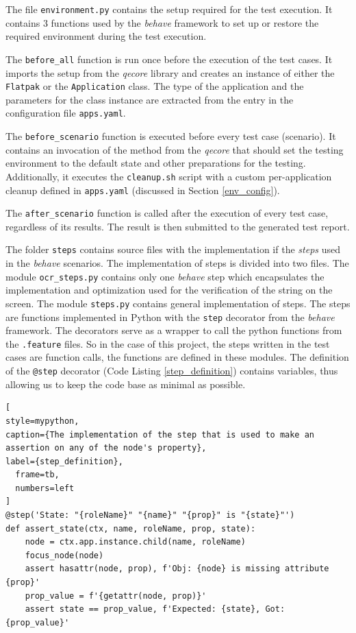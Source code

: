 The file \texttt{environment.py} contains the setup required for the test execution. It contains 3 functions used by the \textit{behave} framework to set up or restore the required environment during the test execution. 

The \texttt{before\_all} function is run once before the execution of the test cases. It imports the setup from the \textit{qecore} library and creates an instance of either the \texttt{Flatpak} or the \texttt{Application} class. The type of the application and the parameters for the class instance are extracted from the entry in the configuration file \texttt{apps.yaml}. 

The \texttt{before\_scenario} function is executed before every test case (scenario). It contains an invocation of the method from the \textit{qecore} that should set the testing environment to the default state and other preparations for the testing. Additionally, it executes the \texttt{cleanup.sh} script with a custom per-application cleanup defined in \texttt{apps.yaml} (discussed in Section \ref{env_config}). 

The \texttt{after\_scenario} function is called after the execution of every test case, regardless of its results. The result is then submitted to the generated test report.

The folder \texttt{steps} contains source files with the implementation if the \textit{steps} used in the \textit{behave} scenarios. The implementation of steps is divided into two files. The module \texttt{ocr\_steps.py} contains only one \textit{behave} step which encapsulates the implementation and optimization used for the verification of the string on the screen. The module \texttt{steps.py} contains general implementation of steps. The steps are functions implemented in Python with the \texttt{step} decorator from the \textit{behave} framework. The decorators serve as a wrapper to call the python functions from the \texttt{.feature} files. So in the case of this project, the steps written in the test cases are function calls, the functions are defined in these modules. The definition of the \texttt{@step} decorator (Code Listing \ref{step_definition}) contains variables, thus allowing us to keep the code base as minimal as possible.

\begin{lstlisting}[
style=mypython,
caption={The implementation of the step that is used to make an assertion on any of the node's property},
label={step_definition},
  frame=tb,
  numbers=left
]
@step('State: "{roleName}" "{name}" "{prop}" is "{state}"')
def assert_state(ctx, name, roleName, prop, state):
    node = ctx.app.instance.child(name, roleName)
    focus_node(node)
    assert hasattr(node, prop), f'Obj: {node} is missing attribute {prop}'
    prop_value = f'{getattr(node, prop)}'
    assert state == prop_value, f'Expected: {state}, Got: {prop_value}'
\end{lstlisting}

